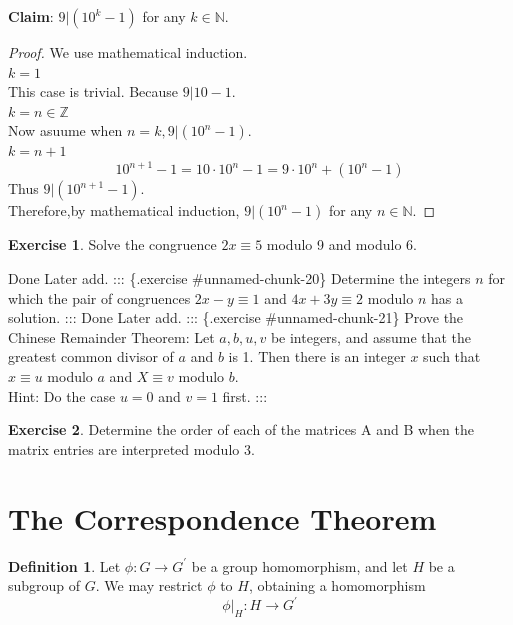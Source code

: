 \documentclass[
]{book}
\theoremstyle{definition}
\newtheorem{definition}{Definition}[chapter]
\theoremstyle{definition}
\theoremstyle{definition}
\newtheorem{exercise}{Exercise}[chapter]
\theoremstyle{definition}
\theoremstyle{remark}
\begin{document}
\textbf{Claim}: \(9|(10^k-1)\) for any \(k\in \mathbb{N}\).

\begin{proof}
We use mathematical induction.\\
\emph{\(k=1\)}\\
This case is trivial. Because \(9|10-1\).\\
\emph{\(k=n\in\mathbb{Z}\)}\\
Now asuume when \(n=k, 9|(10^n-1)\).\\
\emph{\(k=n+1\)}
\[10^{n+1}-1 =10\cdot 10^{n}-1=9\cdot 10^n + (10^n - 1) \]
Thus \(9\vert (10^{n+1}-1)\).\\
Therefore,by mathematical induction, \(9|(10^n-1)\) for any \(n\in \mathbb{N}\).
\end{proof}

\begin{exercise}
\protect\hypertarget{exr:unnamed-chunk-19}{}\label{exr:unnamed-chunk-19}Solve the congruence \(2x \equiv 5\) modulo 9 and modulo 6.
\end{exercise}

Done Later add.
::: \{.exercise \#unnamed-chunk-20\}
Determine the integers \(n\) for which the pair of congruences \(2x - y \equiv 1\) and \(4x + 3y \equiv 2\) modulo \(n\) has a solution.
:::
Done Later add.
::: \{.exercise \#unnamed-chunk-21\}
Prove the Chinese Remainder Theorem: Let \(a, b, u, v\) be integers, and assume that the greatest common divisor of \(a\) and \(b\) is 1. Then there is an integer \(x\) such that \(x \equiv u\) modulo \(a\) and \(X \equiv v\) modulo \(b\).\\
Hint: Do the case \(u = 0\) and \(v = 1\) first.
:::

\begin{exercise}
\protect\hypertarget{exr:unnamed-chunk-22}{}\label{exr:unnamed-chunk-22}Determine the order of each of the matrices A and B when the matrix entries are interpreted modulo 3.
\end{exercise}

\hypertarget{the-correspondence-theorem}{%
\section{The Correspondence Theorem}\label{the-correspondence-theorem}}

\begin{definition}
\protect\hypertarget{def:unnamed-chunk-23}{}\label{def:unnamed-chunk-23}Let \(\phi: G \rightarrow G^\prime\) be a group homomorphism, and let \(H\) be a subgroup of \(G\). We may restrict \(\phi\) to \(H\), obtaining a homomorphism
\[\phi|_H: H \rightarrow G^\prime\]
\end{definition}
\end{document}
